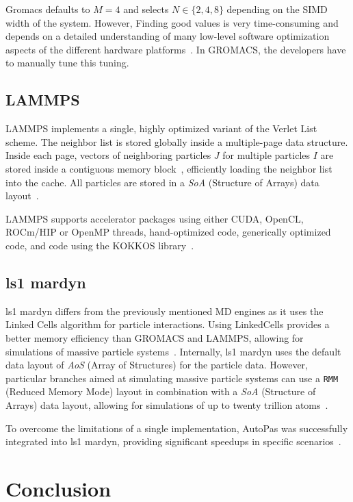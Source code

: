 \documentclass[conference]{IEEEtran}
\begin{document}
Gromacs defaults to $M=4$ and selects $N \in \{2, 4, 8\}$ depending on the SIMD width of the system. However, Finding good values is very time-consuming and depends on a detailed understanding of many low-level software optimization aspects of the different hardware platforms~\cite{PALL20132641}. In GROMACS, the developers have to manually tune this tuning.

\subsection{LAMMPS}

LAMMPS implements a single, highly optimized variant of the Verlet List scheme. The neighbor list is stored globally inside a multiple-page data structure. Inside each page, vectors of neighboring particles $J$ for multiple particles $I$ are stored inside a contiguous memory block~\cite{THOMPSON2022108171}, efficiently loading the neighbor list into the cache.
All particles are stored in a \textit{SoA} (Structure of Arrays) data layout~\cite{THOMPSON2022108171}.

LAMMPS supports accelerator packages using either CUDA, OpenCL, ROCm/HIP or OpenMP threads, hand-optimized
code, generically optimized code, and code using the KOKKOS library~\cite{Seckler2021}.


\subsection{ls1 mardyn}

ls1 mardyn differs from the previously mentioned MD engines as it uses the Linked Cells algorithm for particle interactions. Using LinkedCells provides a better memory efficiency than GROMACS and LAMMPS, allowing for simulations of massive particle systems~\cite{tchipev2019twe}. Internally, ls1 mardyn uses the default data layout of \textit{AoS} (Array of Structures) for the particle data. However, particular branches aimed at simulating massive particle systems can use a \texttt{RMM} (Reduced Memory Mode) layout in combination with a \textit{SoA} (Structure of Arrays) data layout, allowing for simulations of up to twenty trillion atoms~\cite{tchipev2019twe}.

To overcome the limitations of a single implementation, AutoPas was successfully integrated into ls1 mardyn, providing significant speedups in specific scenarios~\cite{SECKLER2021101296}.


\section{Conclusion}








\newpage
\newpage
\tableofcontents
\end{document}
